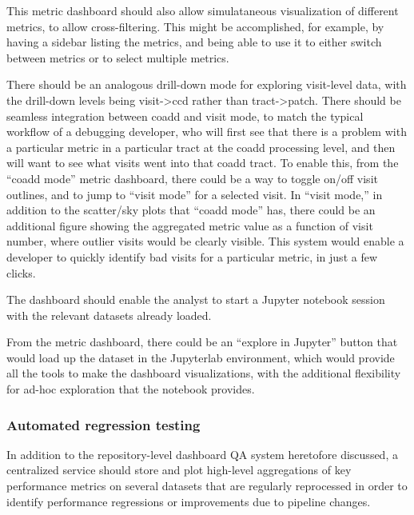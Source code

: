 This metric dashboard should also allow simulataneous visualization of different metrics, to allow cross-filtering.
This might be accomplished, for example, by having a sidebar listing the metrics, and being able to use it to either switch between metrics or to select multiple metrics.

There should be an analogous drill-down mode for exploring visit-level data, with the drill-down levels being visit->ccd rather than tract->patch.
There should be seamless integration between coadd and visit mode, to match the typical workflow of a debugging developer, who will first see that there is a problem with a particular metric in a particular tract at the coadd processing level, and then will want to see what visits went into that coadd tract.
To enable this, from the ``coadd mode'' metric dashboard, there could be a way to toggle on/off visit outlines, and to jump to ``visit mode'' for a selected visit.
In ``visit mode,'' in addition to the scatter/sky plots that ``coadd mode'' has, there could be an additional figure showing the aggregated metric value as a function of visit number, where outlier visits would be clearly visible.
This system would enable a developer to quickly identify bad visits for a particular metric, in just a few clicks.


\begin{recommendation}
The dashboard should enable the analyst to start a Jupyter notebook session with the relevant datasets already loaded.
\end{recommendation}

From the metric dashboard, there could be an ``explore in Jupyter'' button that would load up the dataset in the Jupyterlab environment, which would provide all the tools to make the dashboard visualizations, with the additional flexibility for ad-hoc exploration that the notebook provides.


\subsubsection{Automated regression testing} \label{sec:regression}


\begin{recommendation}
In addition to the repository-level dashboard QA system heretofore discussed, a centralized service should store and plot high-level aggregations of key performance metrics on several datasets that are regularly reprocessed in order to identify performance regressions or improvements due to pipeline changes.
\end{recommendation}



